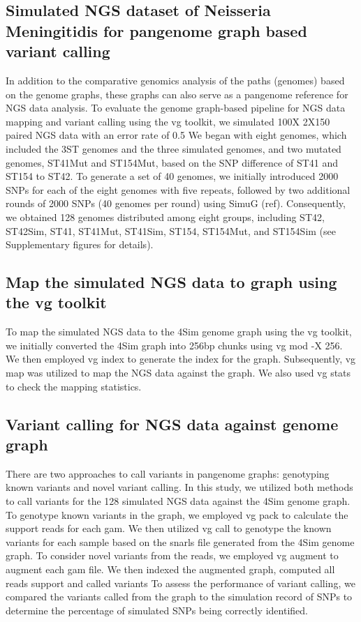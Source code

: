 \subsection{Simulated NGS dataset of Neisseria Meningitidis for pangenome graph based variant calling}
In addition to the comparative genomics analysis of the paths (genomes) based on the genome graphs, these graphs can also serve as a pangenome reference for NGS data analysis. To evaluate the genome graph-based pipeline for NGS data mapping and variant calling using the vg toolkit, we simulated 100X 2X150 paired NGS data with an error rate of 0.5%
We began with eight genomes, which included the 3ST genomes and the three simulated genomes, and two mutated genomes, ST41Mut and ST154Mut, based on the SNP difference of ST41 and ST154 to ST42. To generate a set of 40 genomes, we initially introduced 2000 SNPs for each of the eight genomes with five repeats, followed by two additional rounds of 2000 SNPs (40 genomes per round) using SimuG (ref). Consequently, we obtained 128 genomes distributed among eight groups, including ST42, ST42Sim, ST41, ST41Mut, ST41Sim, ST154, ST154Mut, and ST154Sim (see Supplementary figures for details).
\subsection{Map the simulated NGS data to graph using the vg toolkit}
To map the simulated NGS data to the 4Sim genome graph using the vg toolkit, we initially converted the 4Sim graph into 256bp chunks using vg mod -X 256. We then employed vg index to generate the index for the graph. Subsequently, vg map was utilized to map the NGS data against the graph. We also used vg stats to check the mapping statistics. 
\subsection{Variant calling for NGS data against genome graph}
There are two approaches to call variants in pangenome graphs: genotyping known variants and novel variant calling. In this study, we utilized both methods to call variants for the 128 simulated NGS data against the 4Sim genome graph.
To genotype known variants in the graph, we employed vg pack to calculate the support reads for each gam. We then utilized vg call to genotype the known variants for each sample based on the snarls file generated from the 4Sim genome graph.
To consider novel variants from the reads, we employed vg augment to augment each gam file. We then indexed the augmented graph, computed all reads support and called variants 
To assess the performance of variant calling, we compared the variants called from the graph to the simulation record of SNPs to determine the percentage of simulated SNPs being correctly identified.
